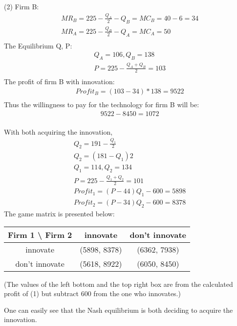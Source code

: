 \documentclass[a4paper]{article}
\begin{document}
\begin{answer}[Cement (1)]
    (2) Firm B:\\
    \begin{align*}
        & MR_B = 225 - \frac{Q_A}{2} - Q_B = MC_B = 40 - 6 = 34\\
        & MR_A = 225 - \frac{Q_B}{2} - Q_A = MC_A = 50\\
    \end{align*}
    The Equilibrium Q, P:
    \begin{align*}
        & Q_A = 106, Q_B = 138\\
        & P = 225 - \frac{Q_A + Q_B}{2} = 103\\
    \end{align*}
    The profit of firm B with innovation:
    \begin{align*}
        & Profit_B = (103-34)*138 = 9522\\
    \end{align*}
    Thus the willingness to pay for the technology for firm B will be: \\
    \begin{align*}
        & 9522 - 8450 = 1072\\
    \end{align*}
    \end{answer}
    
    \begin{answer}[Cement (2)]
    With both acquiring the innovation, 
    \begin{align*}
        & Q_2=191-\frac{Q_1}{2} \\
        & Q_2=(181-Q_1)2 \\
        & Q_1=114, Q_2=134  \\
        & P=225-\frac{Q_1+Q_2}{2}=101 \\
        & Profit_1=(P-44)Q_1-600=5898 \\
        & Profit_2=(P-34)Q_2-600=8378
    \end{align*}
    The game matrix is presented below:
    \begin{center}
    \begin{tabular}{|c|c|c|}
        \hline
        Firm 1 \textbackslash \; Firm 2 & innovate & don't innovate \\
        \hline
        innovate  & (5898, 8378)  & (6362, 7938)  \\
        \hline
        don't innovate  & (5618, 8922)  & (6050, 8450)  \\
        \hline
    \end{tabular}
    \end{center}
    (The values of the left bottom and the top right box are from the calculated profit of (1) but subtract 600 from the one who innovates.)
    
    One can easily see that the Nash equilibrium is both deciding to acquire the innovation.
    \end{answer}
    
\end{document}
